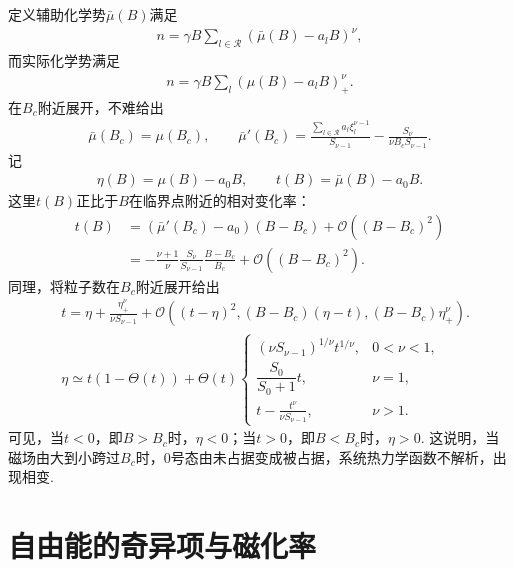 定义辅助化学势\(\bar{\mu}(B)\)满足
\begin{align*}
	n
	=
	\gamma B
	\sum_{l\in\mathcal{R}}
	\left(\bar{\mu}(B)-a_{l}B\right)^{\nu},
\end{align*}
而实际化学势满足
\begin{align*}
	n
	=
	\gamma B
	\sum_{l}
	\left(\mu(B)-a_{l}B\right)_{+}^{\nu}.
\end{align*}
在\(B_{c}\)附近展开，不难给出
\begin{align*}
	\bar{\mu}(B_{c})=\mu(B_{c}),
	\qquad
	\bar{\mu}'(B_{c})
	=
	\frac{\sum_{l\in\mathcal{R}}a_{l}\xi_{l}^{\nu-1}}{S_{\nu-1}}
	-\frac{S_{\nu}}{\nu B_{c}S_{\nu-1}}.
\end{align*}
记
\begin{align*}
	\eta(B)=\mu(B)-a_{0}B,
	\qquad
	t(B)=\bar{\mu}(B)-a_{0}B .
\end{align*}
这里\(t(B)\)正比于\(B\)在临界点附近的相对变化率：
\begin{align*}
	t(B)
	&=
	\left(\bar{\mu}'(B_{c})-a_{0}\right)(B-B_{c})
	+\mathcal{O}\!\left((B-B_{c})^{2}\right)\\
	&=
	-\frac{\nu+1}{\nu}
	\frac{S_{\nu}}{S_{\nu-1}}
	\frac{B-B_{c}}{B_{c}}
	+\mathcal{O}\!\left((B-B_{c})^{2}\right).
\end{align*}
同理，将粒子数在\(B_c\)附近展开给出
\begin{align*}
	&t
	=
	\eta
	+
	\frac{\eta_{+}^{\nu}}{\nu S_{\nu-1}}
	+
	\mathcal{O}\!\left(
	(t-\eta)^{2},
	(B-B_{c})(\eta-t),
	(B-B_{c})\eta_{+}^{\nu}
	\right).\\
	&\eta
	\simeq
	t(1-\Theta(t))
	+\Theta(t)
	\begin{cases}
		(\nu S_{\nu-1})^{1/\nu}t^{1/\nu},
		&0<\nu<1,\\[4pt]
		\dfrac{S_{0}}{S_{0}+1}t,
		&\nu=1,\\[8pt]
		t-\frac{t^{\nu}}{\nu S_{\nu-1}},
		&\nu>1.
	\end{cases}
\end{align*}
可见，当\(t<0\)，即\(B>B_{c}\)时，\(\eta<0\)；当\(t>0\)，即\(B<B_{c}\)时，\(\eta>0\). 这说明，当磁场由大到小跨过\(B_{c}\)时，\(0\)号态由未占据变成被占据，系统热力学函数不解析，出现相变.

\section{自由能的奇异项与磁化率}

